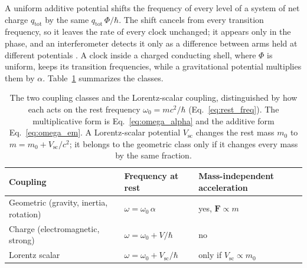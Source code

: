 \documentclass[aps,prd,onecolumn,tightenlines,nofootinbib,notitlepage,11pt,floatfix]{revtex4-2}
\theoremstyle{indentedtheorem}
\begin{document}
A uniform additive potential shifts the frequency of every level of a system of net charge $q_\text{tot}$ by the same $q_\text{tot} \, \Phi/\hbar$. The shift cancels from every transition frequency, so it leaves the rate of every clock unchanged; it appears only in the phase, and an interferometer detects it only as a difference between arms held at different potentials \citep{Aharonov1959Significance}. A clock inside a charged conducting shell, where $\Phi$ is uniform, keeps its transition frequencies, while a gravitational potential multiplies them by $\alpha$. Table~\ref{tab:classes} summarizes the classes.

\begin{table}[htbp]
\centering
\fontsize{10}{11.5}\selectfont
\caption{The two coupling classes and the Lorentz-scalar coupling, distinguished by how each acts on the rest frequency $\omega_0=mc^2/\hbar$ (Eq.~\eqref{eq:rest_freq}). The multiplicative form is Eq.~\eqref{eq:omega_alpha} and the additive form Eq.~\eqref{eq:omega_em}. A Lorentz-scalar potential $V_\text{sc}$ changes the rest mass $m_0$ to $m=m_0+V_\text{sc}/c^2$; it belongs to the geometric class only if it changes every mass by the same fraction.}
\label{tab:classes}
\begin{tabular}{lll}
\toprule
\textbf{Coupling} & \textbf{Frequency at rest} & \textbf{Mass-independent acceleration} \\
\midrule
Geometric (gravity, inertia, rotation) & $\omega=\omega_0\,\alpha$ & yes, $\mathbf{F}\propto m$ \\
Charge (electromagnetic, strong) & $\omega=\omega_0+V/\hbar$ & no \\
Lorentz scalar & $\omega=\omega_0+V_\text{sc}/\hbar$ & only if $V_\text{sc}\propto m_0$ \\
\bottomrule
\end{tabular}
\end{table}
\end{document}
